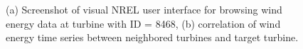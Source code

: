 \documentclass[10pt, conference, compsocconf]{IEEEtran}
\begin{document}
\begin{figure}[h]
\centering
{}
\caption{(a) Screenshot of visual NREL user interface for browsing wind energy data at turbine with ID = 8468, (b) correlation of wind energy time series between neighbored turbines and target turbine.}
\label{fig:park}
\end{figure}
\end{document}
